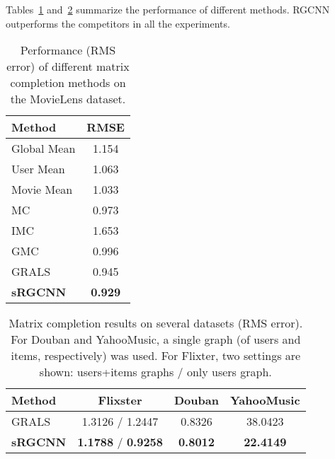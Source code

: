 \documentclass{article}
\begin{document}
Tables~\ref{tab:results-movielens} and~\ref{tab:other-datasets} summarize the performance of different methods. RGCNN outperforms the competitors in all the experiments. 



\begin{table}[!h]
\caption{Performance (RMS error) of different matrix completion methods on the MovieLens dataset.\vspace{-2.25mm}}
\label{tab:results-movielens}
\vskip 0.15in
\begin{center}
\begin{small}
\begin{sc}
\begin{tabular}{lc}
\hline
\abovespace\belowspace
Method & RMSE \\
\hline
\abovespace 
Global Mean & 1.154\\
User Mean & 1.063\\
Movie Mean & 1.033\\
MC \cite{candes2012exact} & 0.973\\
IMC \cite{jain2013provable,xu2013speedup} & 1.653\\
GMC  \cite{kalofolias2014matrix} & 0.996\\
GRALS \cite{rao2015collaborative} & 0.945\\
{\bf sRGCNN} & {\bf 0.929} \\
\hline
\end{tabular}
\end{sc}
\end{small}
\end{center}
\vskip -0.1in
\end{table}




\begin{table}[!h]
\caption{
Matrix completion results on several datasets (RMS error). For Douban and YahooMusic, a single graph (of users and items, respectively) was used. For Flixter, two settings are shown: users+items graphs / only users graph. \vspace{-2.25mm} 
}
\label{tab:other-datasets}
\vskip 0.15in
\begin{center}
\begin{small}
\begin{sc}
\begin{tabular}{lccc}
\hline
\abovespace\belowspace
Method & Flixster & Douban & YahooMusic \\
\hline
\abovespace 
GRALS & 1.3126 / 1.2447 & 0.8326 & 38.0423\\ 
{\bf sRGCNN} & {\bf 1.1788} / {\bf 0.9258} & {\bf 0.8012} & {\bf 22.4149} \\
\hline
\end{tabular}
\end{sc}
\end{small}
\end{center}
\end{table}
\end{document}
